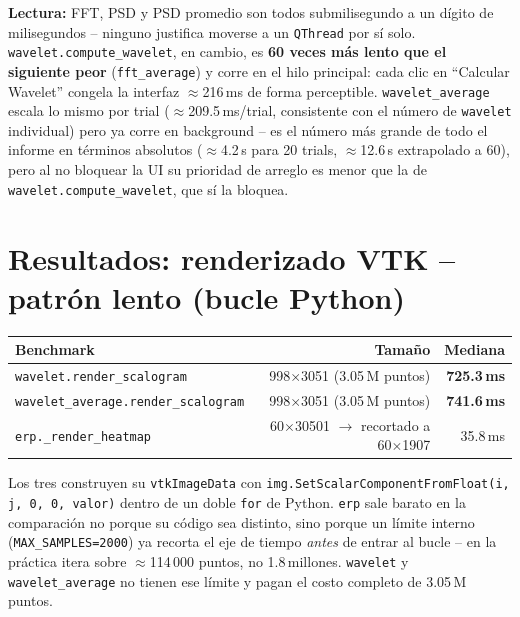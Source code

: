 \documentclass[11pt,a4paper]{article}
\begin{document}
\textbf{Lectura:} FFT, PSD y PSD promedio son todos submilisegundo a un dígito de milisegundos -- ninguno
justifica moverse a un \texttt{QThread} por sí solo. \texttt{wavelet.compute\_\allowbreak wavelet}, en
cambio, es \textbf{60 veces más lento que el siguiente peor} (\texttt{fft\_\allowbreak average}) y corre en
el hilo principal: cada clic en ``Calcular Wavelet'' congela la interfaz $\approx$216\,ms de forma
perceptible. \texttt{wavelet\_\allowbreak average} escala lo mismo por trial ($\approx$209.5\,ms/trial,
consistente con el número de \texttt{wavelet} individual) pero ya corre en background -- es el número más
grande de todo el informe en términos absolutos ($\approx$4.2\,s para 20 trials, $\approx$12.6\,s
extrapolado a 60), pero al no bloquear la UI su prioridad de arreglo es menor que la de
\texttt{wavelet.compute\_\allowbreak wavelet}, que sí la bloquea.

\section{Resultados: renderizado VTK -- patrón lento (bucle Python)}
\label{sec:resultados-render-lento}

\begin{center}
\begin{tabular}{lrr}
\toprule
\textbf{Benchmark} & \textbf{Tamaño} & \textbf{Mediana} \\
\midrule
\texttt{wavelet.render\_\allowbreak scalogram} & 998$\times$3051 (3.05\,M puntos) & \textbf{725.3\,ms} \\
\texttt{wavelet\_\allowbreak average.render\_\allowbreak scalogram} & 998$\times$3051 (3.05\,M puntos) & \textbf{741.6\,ms} \\
\texttt{erp.\_\allowbreak render\_\allowbreak heatmap} & 60$\times$30501 $\to$ recortado a 60$\times$1907 & 35.8\,ms \\
\bottomrule
\end{tabular}
\end{center}

Los tres construyen su \texttt{vtkImageData} con \texttt{img.SetScalarComponentFromFloat(i, j, 0, 0, valor)}
dentro de un doble \texttt{for} de Python. \texttt{erp} sale barato en la comparación no porque su código sea
distinto, sino porque un límite interno (\texttt{MAX\_\allowbreak SAMPLES=2000}) ya recorta el eje de tiempo
\emph{antes} de entrar al bucle -- en la práctica itera sobre $\approx$114\,000 puntos, no 1.8\,millones.
\texttt{wavelet} y \texttt{wavelet\_\allowbreak average} no tienen ese límite y pagan el costo completo de 3.05\,M
puntos.
\end{document}
